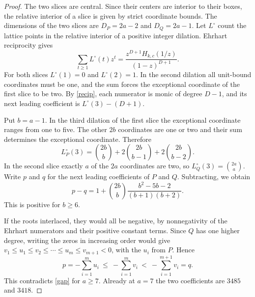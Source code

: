 \documentclass[11pt]{article}
\newcommand{\bin}[2]{\binom{#1}{#2}}
\begin{document}
\begin{proof}
The two slices are central. Since their centers are interior to their
boxes, the relative interior of a slice is given by strict coordinate
bounds. The dimensions of the two slices are $D_P=2a-2$ and $D_Q=2a-1$.
Let $L^\circ$ count the lattice points in the relative interior of a
positive integer dilation. Ehrhart reciprocity gives
\begin{equation}\label{recip}
 \sum_{t\ge1}L^\circ(t)z^t=
   \frac{z^{D+1}H_{k,c}(1/z)}{(1-z)^{D+1}}.
\end{equation}
For both slices $L^\circ(1)=0$ and $L^\circ(2)=1$. In the second
dilation all unit-bound coordinates must be one, and the sum forces the
exceptional coordinate of the first slice to be two. By
\eqref{recip}, each numerator is monic of degree $D-1$, and its next
leading coefficient is $L^\circ(3)-(D+1)$.

Put $b=a-1$. In the third dilation of the first slice the exceptional
coordinate ranges from one to five. The other $2b$ coordinates are one
or two and their sum determines the exceptional coordinate. Therefore
\[
 L_P^\circ(3)=\bin{2b}{b}+2\bin{2b}{b-1}+2\bin{2b}{b-2}.
\]
In the second slice exactly $a$ of the $2a$ coordinates are two, so
$L_Q^\circ(3)=\bin{2a}{a}$. Write $p$ and $q$ for the next leading
coefficients of $P$ and $Q$. Subtracting, we obtain
\begin{equation}\label{gap}
 p-q=1+\bin{2b}{b}\frac{b^2-5b-2}{(b+1)(b+2)}.
\end{equation}
This is positive for $b\ge6$.

If the roots interlaced, they would all be negative, by nonnegativity
of the Ehrhart numerators and their positive constant terms. Since
$Q$ has one higher degree, writing the zeros in increasing order
would give $v_1\le u_1\le v_2\le\cdots\le u_m\le v_{m+1}<0$,
with the $u_i$ from $P$. Hence
\[
 p=-\sum_{i=1}^m u_i\ \le\ -\sum_{i=1}^m v_i
 \ <\ -\sum_{i=1}^{m+1}v_i=q.
\]
This contradicts \eqref{gap} for $a\ge7$. Already at $a=7$ the two
coefficients are $3485$ and $3418$.


\end{proof}
\end{document}
